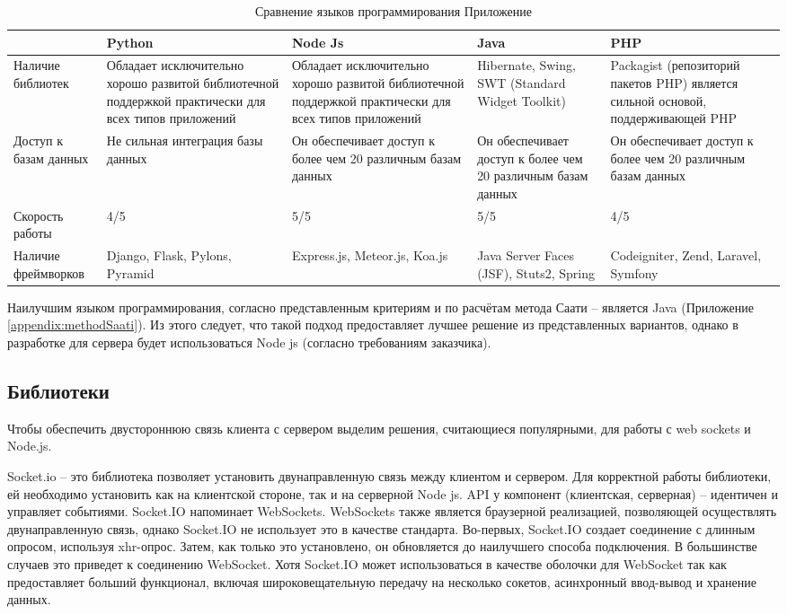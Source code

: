 \begin{table}
	\caption{Сравнение языков программирования  \cite{PHPvsPyt48:online,NodejsVs38:online} Приложение \cite{appendix:comparationPL}}
	\label{comparisonOfProgrammingLanguage}
	\begin{tabularx}{\linewidth}{|X|X|X|X|X|}
		\hline
		& Python & Node Js & Java & PHP \\
		\hline
		Наличие библиотек & Обладает исключительно хорошо развитой библиотечной поддержкой практически для всех типов приложений & Обладает исключительно хорошо развитой библиотечной поддержкой практически для всех типов приложений & Hibernate, Swing, SWT (Standard Widget Toolkit) & Packagist (репозиторий пакетов PHP) является сильной основой, поддерживающей PHP \\
		\hline
		Доступ к базам данных & Не сильная интеграция базы данных & Он обеспечивает доступ к более чем 20 различным базам данных & Он обеспечивает доступ к более чем 20 различным базам данных & Он обеспечивает доступ к более чем 20 различным базам данных \\
		\hline
		Скорость работы & 4/5 & 5/5 & 5/5 & 4/5 \\
		\hline
		Наличие фреймворков & Django, Flask, Pylons, Pyramid & Express.js, Meteor.js, Koa.js & Java Server Faces (JSF), Stuts2, Spring & Codeigniter, Zend, Laravel, Symfony \\
		\hline
	\end{tabularx}
\end{table}

Наилучшим языком программирования, согласно представленным критериям и по расчётам  метода Саати – является Java (Приложение \ref{appendix:methodSaati}). Из этого следует, что такой подход предоставляет лучшее решение из представленных вариантов, однако в разработке для сервера будет использоваться Node js (согласно требованиям заказчика).

\subsection{Библиотеки}

Чтобы обеспечить двустороннюю связь клиента с сервером выделим решения, считающиеся популярными, для работы с web sockets и Node.js.

Socket.io – это библиотека позволяет установить двунаправленную связь между клиентом и сервером. Для корректной работы библиотеки, ей необходимо установить как на клиентской стороне, так и на серверной Node js. API у компонент (клиентская, серверная) – идентичен и управляет событиями. Socket.IO напоминает WebSockets. WebSockets также является браузерной реализацией, позволяющей осуществлять двунаправленную связь, однако Socket.IO не использует это в качестве стандарта. Во-первых, Socket.IO создает соединение с длинным опросом, используя xhr-опрос. Затем, как только это установлено, он обновляется до наилучшего способа подключения. В большинстве случаев это приведет к соединению WebSocket. Хотя Socket.IO может использоваться в качестве оболочки для WebSocket так как предоставляет больший функционал, включая широковещательную передачу на несколько сокетов, асинхронный ввод-вывод и хранение данных.

